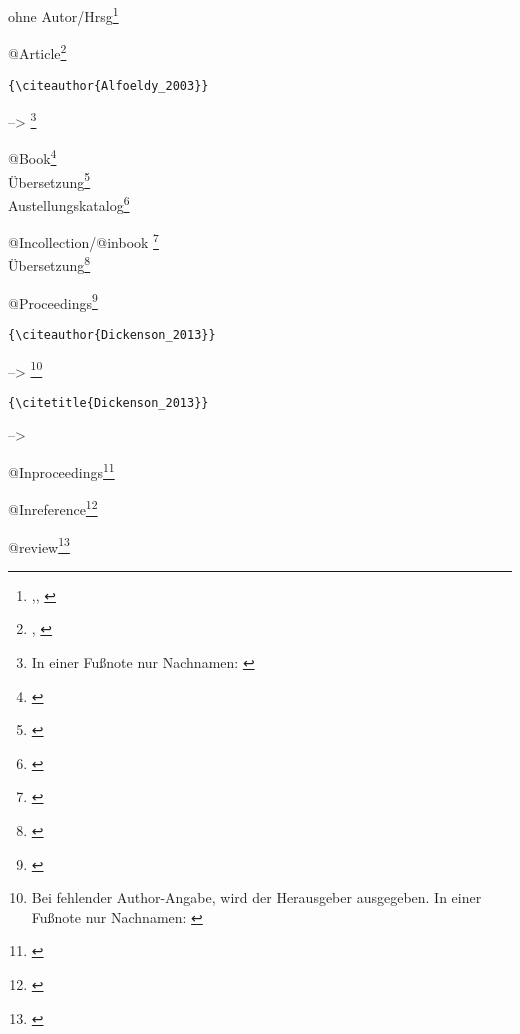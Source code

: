 \documentclass[%
	english,ngerman,%
	11pt,
	paper=A4,					%
draft=false,						%
demo,
	parskip=half+,				%
]{scrreprt}%
\begin{document}
ohne Autor/Hrsg\footnote{\cite{Italie_1976},\cite[vgl.][145--146]{Cosa_1949}, \cite{Paestum_1854}}%


@Article\footnote{
\cite{Coarelli_1977},
\cite{Alfoeldy_2003,Allison_2001,Andreae_1957,Andreae_1957h,Anichini_2012,Babcock_1962,Ball_2013,Bartosiewicz_2003,Baumgart_1935}
}
\begin{footnotesize}
\begin{verbatim}{\citeauthor{Alfoeldy_2003}} \end{verbatim} --> \citeauthor{Alfoeldy_2003}\footnote{In einer Fußnote nur Nachnamen: \citeauthor{Alfoeldy_2003}}
\end{footnotesize}

@Book\footnote{\cite{Beard_2008,Haug_2003,Hilger_2011,Kienast_2004,Kleinwaechter_2001,Kreikenbom_2011,Pedley_1990,Rich_2002}}\\
Übersetzung\footnote{\cite{Lefebvre_2000,Lefebvre_2011}}\\
Austellungskatalog\footnote{\cite{Horn_1976}}

@Incollection/@inbook%
\footnote{\cite{Brogiolo_2006,Burgio_2012,Calapa_2009,Christie_2009,Colin_2000,Davies_2014,Demandt_1982}}
\\
Übersetzung\footnote{\cite{Lefebvre_2012}}


@Proceedings\footnote{\cite{Dickenson_2013,Giannikouri_2011,Hekster_2009,Kurapkat_2014,Maggi_2011}}
\\
\begin{footnotesize}
\begin{verbatim}{\citeauthor{Dickenson_2013}} \end{verbatim} --> \citeauthor{Dickenson_2013}\footnote{Bei fehlender Author-Angabe, wird der Herausgeber ausgegeben. In einer Fußnote nur Nachnamen:  \citeauthor{Dickenson_2013}}
\begin{verbatim}{\citetitle{Dickenson_2013}} \end{verbatim}  --> 
\end{footnotesize}

@Inproceedings\footnote{\cite{Bacchetta_2011,Coqueugniot_2011,Danner_2014,Poupaki_2011,Santoriello_1999,Torelli_1991,Torelli_1988,Tosi_1995}}

@Inreference\footnote{\cite{Rosenberger_2012,Booms_2014,CiancioRossetto_1993,Eder_2001a,Graffunder_1914,Jongman_2001,Kornemann_1933}}

@review\footnote{\cite{Baker_2011,Bell_2011,Bernard_2013,Chamberland_1999,Dyson_2013,Earl_2009,Frost_2001,Giuliano_1978,Hufschmid_2010,Kaiser_2014a}}
\end{document}
